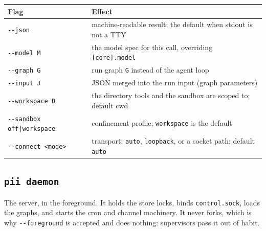 \begin{center}
\begin{tabular}{@{}>{\raggedright\arraybackslash}p{}>{\raggedright\arraybackslash}p{}@{}}
  \toprule
  \textbf{Flag} & \textbf{Effect} \\
  \midrule
  \texttt{-{}-json} & machine-readable result; the default when stdout is not a TTY \\
  \texttt{-{}-model M} & the model spec for this call, overriding \texttt{[core].model} \\
  \texttt{-{}-graph G} & run graph \texttt{G} instead of the agent loop \\
  \texttt{-{}-input J} & JSON merged into the run input (graph parameters) \\
  \texttt{-{}-workspace D} & the directory tools and the sandbox are scoped to; default cwd \\
  \texttt{-{}-sandbox off|workspace} & confinement profile; \texttt{workspace} is the default \\
  \texttt{-{}-connect <mode>} & transport: \texttt{auto}, \texttt{loopback}, or a socket path; default \texttt{auto} \\
  \bottomrule
\end{tabular}
\end{center}

\subsection*{\texttt{pii daemon}}

The server, in the foreground. It holds the store locks, binds \texttt{control.sock}, loads
the graphs, and starts the cron and channel machinery. It never forks, which is why
\texttt{-{}-foreground} is accepted and does nothing: supervisors pass it out of habit.

